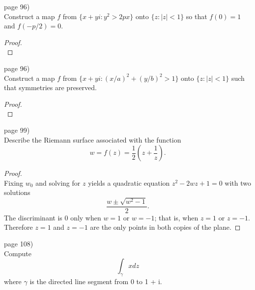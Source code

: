 \documentclass{article}
\newenvironment{problem}[2][Problem]{\begin{trivlist}
\item[\hskip \labelsep {\bfseries #1}\hskip \labelsep {\bfseries #2.}]}{\end{trivlist}}
\begin{document}
\begin{problem}{4} (page 96) \\
  Construct a map $f$ from $\{ x + yi: y^2 > 2px\}$ onto $\{z: |z| < 1\}$ so
  that $f(0) = 1$ and $f(-p/2)=0$.
\end{problem}

\begin{proof} \text{} \\
\end{proof}
\pagebreak

\begin{problem}{7} (page 96) \\
  Construct a map $f$ from $\{x + yi: (x/a)^2 + (y/b)^2 > 1\}$ onto
  $\{z: |z| < 1\}$ such that symmetries are preserved.
\end{problem}

\begin{proof} \text{} \\
\end{proof}
\pagebreak

\begin{problem}{1} (page 99) \\
  Describe the Riemann surface associated with the function \[
    w = f(z) = \frac{1}{2}\left(z + \frac{1}{z}\right).
  \]
\end{problem}

\begin{proof} \text{} \\
  Fixing $w_0$ and solving for $z$ yields a quadratic equation
  $z^2 - 2wz + 1 = 0$ with two solutions \[ \frac{w \pm \sqrt{w^2 - 1}}{2}. \]
  The discriminant is $0$ only when $w = 1$ or $w = -1$;
  that is, when $z = 1$ or $z = -1$. Therefore $z = 1$ and $z=-1$ are the only
  points in both copies of the plane.
\end{proof}
\pagebreak

\begin{problem}{1} (page 108) \\
  Compute \[
    \int_\gamma x dz
  \] where $\gamma$ is the directed line segment from 0 to 1 + i.
\end{problem}
\end{document}
